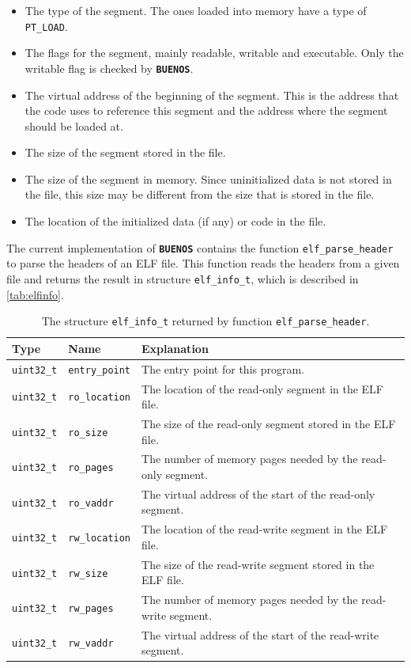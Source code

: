 \documentclass[twoside,a4paper]{report}
\newcommand{\PBS}[1]{\let\temp=\\#1\let\\=\temp}
\newlength{\tablewidth}
\newenvironment{structdescription}{%
\begin{center}%
\begin{tabular}{p{3.5cm}|p{2.5cm}|>{\PBS\raggedright}p{\tablewidth-6\tabcolsep-6cm}}%
\textbf{Type} & \textbf{Name} & \textbf{Explanation} \\ %
}{%
\end{tabular}%
\end{center}%
}
\newcommand{\structfield}[3]{%
\hline%
\texttt{#1} & \texttt{#2} & #3 \\%
}
\newcommand{\buenos}{\texttt{\textbf{BUENOS}}}
\begin{document}
\begin{itemize}
\item The type of the segment. The ones loaded into memory have a type
  of \texttt{PT\_LOAD}.

\item The flags for the segment, mainly readable, writable and
  executable. Only the writable flag is checked by \buenos{}.

\item The virtual address of the beginning of the segment. This is the
  address that the code uses to reference this segment and the address
  where the segment should be loaded at.

\item The size of the segment stored in the file.

\item The size of the segment in memory. Since uninitialized data is
  not stored in the file, this size may be different from the size
  that is stored in the file.

\item The location of the initialized data (if any) or code in the
  file.
\end{itemize}


The current implementation of \buenos{} contains the function
\texttt{elf\_parse\_header}
 to parse the
headers of an ELF file. This function reads the headers from a given
file and returns the result in structure
\texttt{elf\_info\_t}, which
is described in \autoref{tab:elfinfo}.

\begin{table}
\begin{structdescription}

\structfield{uint32\_t}{entry\_point}{The entry point for this
  program.}

\structfield{uint32\_t}{ro\_location}{The location of the read-only
  segment in the ELF file.}
\structfield{uint32\_t}{ro\_size}{The size of the read-only segment
  stored in the ELF file.}
\structfield{uint32\_t}{ro\_pages}{The number of memory pages needed
  by the read-only segment.}
\structfield{uint32\_t}{ro\_vaddr}{The virtual address of the start of
  the read-only segment.}

\structfield{uint32\_t}{rw\_location}{The location of the read-write
  segment in the ELF file.}
\structfield{uint32\_t}{rw\_size}{The size of the read-write segment
  stored in the ELF file.}
\structfield{uint32\_t}{rw\_pages}{The number of memory pages needed
  by the read-write segment.}
\structfield{uint32\_t}{rw\_vaddr}{The virtual address of the start of
  the read-write segment.}

\end{structdescription}

\caption{The structure \texttt{elf\_info\_t} returned by function
\texttt{elf\_parse\_header}.}
\label{tab:elfinfo}
\end{table}
\end{document}
